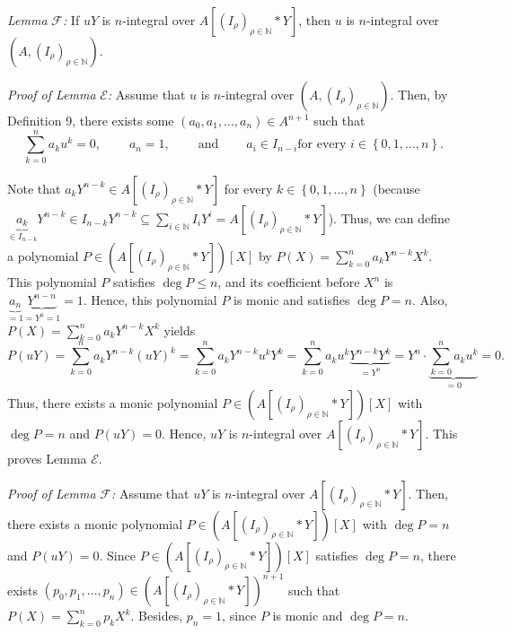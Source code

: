 \documentclass[12pt,final,notitlepage,onecolumn]{article}%
\begin{document}
\textit{Lemma} $\mathcal{F}$\textit{:} If $uY$ is $n$-integral over $A\left[
\left(  I_{\rho}\right)  _{\rho\in\mathbb{N}}\ast Y\right]  $, then $u$ is
$n$-integral over $\left(  A,\left(  I_{\rho}\right)  _{\rho\in\mathbb{N}%
}\right)  $.

\textit{Proof of Lemma }$\mathcal{E}$\textit{:} Assume that $u$ is
$n$-integral over $\left(  A,\left(  I_{\rho}\right)  _{\rho\in\mathbb{N}%
}\right)  $. Then, by Definition 9, there exists some $\left(  a_{0}%
,a_{1},...,a_{n}\right)  \in A^{n+1}$ such that%
\[
\sum\limits_{k=0}^{n}a_{k}u^{k}=0,\ \ \ \ \ \ \ \ \ \ a_{n}%
=1,\ \ \ \ \ \ \ \ \ \ \text{and}\ \ \ \ \ \ \ \ \ \ a_{i}\in I_{n-i}\text{
for every }i\in\left\{  0,1,...,n\right\}  .
\]


Note that $a_{k}Y^{n-k}\in A\left[  \left(  I_{\rho}\right)  _{\rho
\in\mathbb{N}}\ast Y\right]  $ for every $k\in\left\{  0,1,...,n\right\}  $
(because $\underbrace{a_{k}}_{\in I_{n-k}}Y^{n-k}\in I_{n-k}Y^{n-k}%
\subseteq\sum\limits_{i\in\mathbb{N}}I_{i}Y^{i}=A\left[  \left(  I_{\rho
}\right)  _{\rho\in\mathbb{N}}\ast Y\right]  $). Thus, we can define a
polynomial $P\in\left(  A\left[  \left(  I_{\rho}\right)  _{\rho\in\mathbb{N}%
}\ast Y\right]  \right)  \left[  X\right]  $ by $P\left(  X\right)
=\sum\limits_{k=0}^{n}a_{k}Y^{n-k}X^{k}$. This polynomial $P$ satisfies $\deg
P\leq n$, and its coefficient before $X^{n}$ is $\underbrace{a_{n}}%
_{=1}\underbrace{Y^{n-n}}_{=Y^{0}=1}=1$. Hence, this polynomial $P$ is monic
and satisfies $\deg P=n$. Also, $P\left(  X\right)  =\sum\limits_{k=0}%
^{n}a_{k}Y^{n-k}X^{k}$ yields%
\[
P\left(  uY\right)  =\sum\limits_{k=0}^{n}a_{k}Y^{n-k}\left(  uY\right)
^{k}=\sum\limits_{k=0}^{n}a_{k}Y^{n-k}u^{k}Y^{k}=\sum\limits_{k=0}^{n}%
a_{k}u^{k}\underbrace{Y^{n-k}Y^{k}}_{=Y^{n}}=Y^{n}\cdot\underbrace{\sum
\limits_{k=0}^{n}a_{k}u^{k}}_{=0}=0.
\]
Thus, there exists a monic polynomial $P\in\left(  A\left[  \left(  I_{\rho
}\right)  _{\rho\in\mathbb{N}}\ast Y\right]  \right)  \left[  X\right]  $ with
$\deg P=n$ and $P\left(  uY\right)  =0$. Hence, $uY$ is $n$-integral over
$A\left[  \left(  I_{\rho}\right)  _{\rho\in\mathbb{N}}\ast Y\right]  $. This
proves Lemma $\mathcal{E}$.

\textit{Proof of Lemma }$\mathcal{F}$\textit{:} Assume that $uY$ is
$n$-integral over $A\left[  \left(  I_{\rho}\right)  _{\rho\in\mathbb{N}}\ast
Y\right]  $. Then, there exists a monic polynomial $P\in\left(  A\left[
\left(  I_{\rho}\right)  _{\rho\in\mathbb{N}}\ast Y\right]  \right)  \left[
X\right]  $ with $\deg P=n$ and $P\left(  uY\right)  =0$. Since $P\in\left(
A\left[  \left(  I_{\rho}\right)  _{\rho\in\mathbb{N}}\ast Y\right]  \right)
\left[  X\right]  $ satisfies $\deg P=n$, there exists $\left(  p_{0}%
,p_{1},...,p_{n}\right)  \in\left(  A\left[  \left(  I_{\rho}\right)
_{\rho\in\mathbb{N}}\ast Y\right]  \right)  ^{n+1}$ such that $P\left(
X\right)  =\sum\limits_{k=0}^{n}p_{k}X^{k}$. Besides, $p_{n}=1$, since $P$ is
monic and $\deg P=n$.
\end{document}
